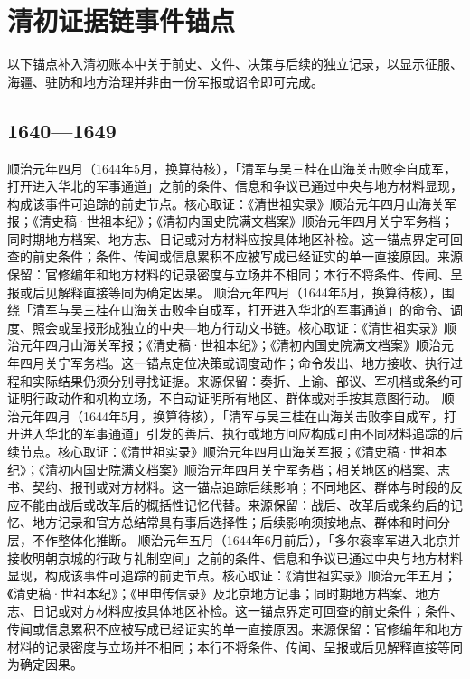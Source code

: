 \section{清初证据链事件锚点}
以下锚点补入清初账本中关于前史、文件、决策与后续的独立记录，以显示征服、海疆、驻防和地方治理并非由一份军报或诏令即可完成。
\subsection{1640—1649}
顺治元年四月（1644年5月，换算待核），「清军与吴三桂在山海关击败李自成军，打开进入华北的军事通道」之前的条件、信息和争议已通过中央与地方材料显现，构成该事件可追踪的前史节点。核心取证：《清世祖实录》顺治元年四月山海关军报；《清史稿·世祖本纪》；《清初内国史院满文档案》顺治元年四月关宁军务档；同时期地方档案、地方志、日记或对方材料应按具体地区补检。这一锚点界定可回查的前史条件；条件、传闻或信息累积不应被写成已经证实的单一直接原因。来源保留：官修编年和地方材料的记录密度与立场并不相同；本行不将条件、传闻、呈报或后见解释直接等同为确定因果。
顺治元年四月（1644年5月，换算待核），围绕「清军与吴三桂在山海关击败李自成军，打开进入华北的军事通道」的命令、调度、照会或呈报形成独立的中央—地方行动文书链。核心取证：《清世祖实录》顺治元年四月山海关军报；《清史稿·世祖本纪》；《清初内国史院满文档案》顺治元年四月关宁军务档。这一锚点定位决策或调度动作；命令发出、地方接收、执行过程和实际结果仍须分别寻找证据。来源保留：奏折、上谕、部议、军机档或条约可证明行政动作和机构立场，不自动证明所有地区、群体或对手按其意图行动。
顺治元年四月（1644年5月，换算待核），「清军与吴三桂在山海关击败李自成军，打开进入华北的军事通道」引发的善后、执行或地方回应构成可由不同材料追踪的后续节点。核心取证：《清世祖实录》顺治元年四月山海关军报；《清史稿·世祖本纪》；《清初内国史院满文档案》顺治元年四月关宁军务档；相关地区的档案、志书、契约、报刊或对方材料。这一锚点追踪后续影响；不同地区、群体与时段的反应不能由战后或改革后的概括性记忆代替。来源保留：战后、改革后或条约后的记忆、地方记录和官方总结常具有事后选择性；后续影响须按地点、群体和时间分层，不作整体化推断。
顺治元年五月（1644年6月前后），「多尔衮率军进入北京并接收明朝京城的行政与礼制空间」之前的条件、信息和争议已通过中央与地方材料显现，构成该事件可追踪的前史节点。核心取证：《清世祖实录》顺治元年五月；《清史稿·世祖本纪》；《甲申传信录》及北京地方记事；同时期地方档案、地方志、日记或对方材料应按具体地区补检。这一锚点界定可回查的前史条件；条件、传闻或信息累积不应被写成已经证实的单一直接原因。来源保留：官修编年和地方材料的记录密度与立场并不相同；本行不将条件、传闻、呈报或后见解释直接等同为确定因果。
